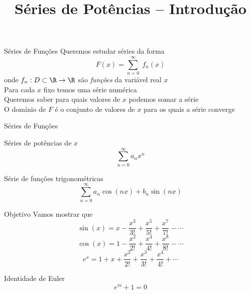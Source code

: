 
\usepackage{integracao_e_series}

\title{Séries de Potências -- Introdução}



\addtitle

\begin{frame}{Séries de Funções}
  Queremos estudar séries da forma
  \[
    F(x) = \sum_{n=0}^\infty\; f_n(x)
  \]
  \pause
  onde $f_n:D \subset \R\to\R$ são \emph{funções} da variável real $x$ \\[5mm]

  \pause
  Para cada $x$ fixo temos uma série numérica \\[5mm]

  \pause
  Queremos saber para quais valores de $x$ podemos somar a série \\[5mm]

  \pause
  O domínio de $F$ é o conjunto de valores de $x$ para os quais a série converge
\end{frame}

\begin{frame}{Séries de Funções}
  \begin{description}[<+->]
    \item[Séries de Potências] Séries de potências de $x$
    \[
      \sum_{n=0}^\infty a_n x^n
    \]

    \item[Séries de Fourier] Série de funções trigonométricas
    \[
      \sum_{n=0}^\infty a_n \cos(nx) + b_n \sin(nx)
    \]
  \end{description}
\end{frame}

\begin{frame}{Objetivo}
  Vamos mostrar que
  \pause
  \[
    \sin(x) = x - \frac{x^3}{3!} + \frac{x^5}{5!} + \frac{x^7}{7!} - \cdots
  \]
  \pause
  \[
    \cos(x) = 1 - \frac{x^2}{2!} + \frac{x^4}{4!} + \frac{x^8}{8!} - \cdots
  \]
  \pause
  \[
    e^x = 1 + x + \frac{x^2}{2!} + \frac{x^3}{3!} + \frac{x^4}{4!} +  \cdots
  \]
\end{frame}

\begin{frame}{Identidade de Euler}
  \Huge
  \[
    e^{\pi i} + 1 = 0
  \]
\end{frame}



